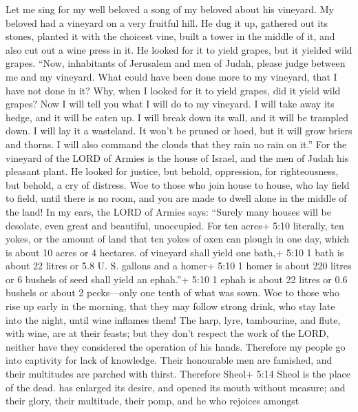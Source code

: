  Let me sing for my well beloved a song of my beloved about
his vineyard. My beloved had a vineyard on a very fruitful hill.
 He dug it up, gathered out its stones, planted it with the
choicest vine, built a tower in the middle of it, and also cut out a
wine press in it. He looked for it to yield grapes, but it yielded wild
grapes.  ``Now, inhabitants of Jerusalem and men of Judah,
please judge between me and my vineyard.  What could have
been done more to my vineyard, that I have not done in it? Why, when I
looked for it to yield grapes, did it yield wild grapes? 
Now I will tell you what I will do to my vineyard. I will take away its
hedge, and it will be eaten up. I will break down its wall, and it will
be trampled down.  I will lay it a wasteland. It won't be
pruned or hoed, but it will grow briers and thorns. I will also command
the clouds that they rain no rain on it.''  For the vineyard
of the LORD of Armies is the house of Israel, and the men of Judah his
pleasant plant. He looked for justice, but behold, oppression, for
righteousness, but behold, a cry of distress.  Woe to those
who join house to house, who lay field to field, until there is no room,
and you are made to dwell alone in the middle of the land! 
In my ears, the LORD of Armies says: ``Surely many houses will be
desolate, even great and beautiful, unoccupied.  For ten
acres+ 5:10 literally, ten yokes, or the amount of land that ten yokes
of oxen can plough in one day, which is about 10 acres or 4 hectares. of
vineyard shall yield one bath,+ 5:10 1 bath is about 22 litres or 5.8 U.
S. gallons and a homer+ 5:10 1 homer is about 220 litres or 6 bushels of
seed shall yield an ephah.''+ 5:10 1 ephah is about 22 litres or 0.6
bushels or about 2 pecks---only one tenth of what was sown.
 Woe to those who rise up early in the morning, that they
may follow strong drink, who stay late into the night, until wine
inflames them!  The harp, lyre, tambourine, and flute, with
wine, are at their feasts; but they don't respect the work of the LORD,
neither have they considered the operation of his hands. 
Therefore my people go into captivity for lack of knowledge. Their
honourable men are famished, and their multitudes are parched with
thirst.  Therefore Sheol+ 5:14 Sheol is the place of the
dead. has enlarged its desire, and opened its mouth without measure; and
their glory, their multitude, their pomp, and he who rejoices amongst

